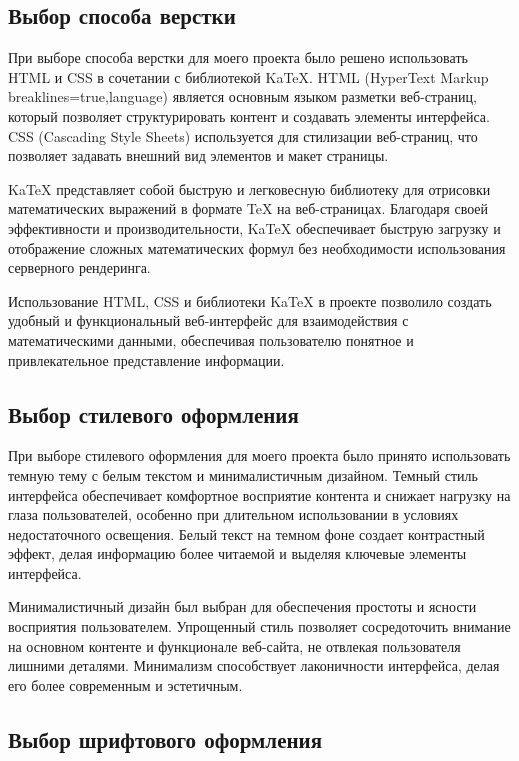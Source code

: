 \documentclass{article}
\begin{document}
    \subsection{Выбор способа верстки}

    При выборе способа верстки для моего проекта было решено использовать HTML и CSS в сочетании с библиотекой KaTeX. HTML (HyperText Markup breaklines=true,language) является основным языком разметки веб-страниц, который позволяет структурировать контент и создавать элементы интерфейса. CSS (Cascading Style Sheets) используется для стилизации веб-страниц, что позволяет задавать внешний вид элементов и макет страницы.

    KaTeX представляет собой быструю и легковесную библиотеку для отрисовки математических выражений в формате TeX на веб-страницах. Благодаря своей эффективности и производительности, KaTeX обеспечивает быструю загрузку и отображение сложных математических формул без необходимости использования серверного рендеринга.

    Использование HTML, CSS и библиотеки KaTeX в проекте позволило создать удобный и функциональный веб-интерфейс для взаимодействия с математическими данными, обеспечивая пользователю понятное и привлекательное представление информации.


    \subsection{Выбор стилевого оформления}

    При выборе стилевого оформления для моего проекта было принято использовать темную тему с белым текстом и минималистичным дизайном. Темный стиль интерфейса обеспечивает комфортное восприятие контента и снижает нагрузку на глаза пользователей, особенно при длительном использовании в условиях недостаточного освещения. Белый текст на темном фоне создает контрастный эффект, делая информацию более читаемой и выделяя ключевые элементы интерфейса.

    Минималистичный дизайн был выбран для обеспечения простоты и ясности восприятия пользователем. Упрощенный стиль позволяет сосредоточить внимание на основном контенте и функционале веб-сайта, не отвлекая пользователя лишними деталями. Минимализм способствует лаконичности интерфейса, делая его более современным и эстетичным.


    \subsection{Выбор шрифтового оформления}
\end{document}
